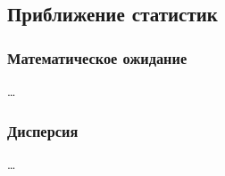 \subsection{Приближение статистик}

\subsubsection{Математическое ожидание}

\dots

\subsubsection{Дисперсия}

\dots